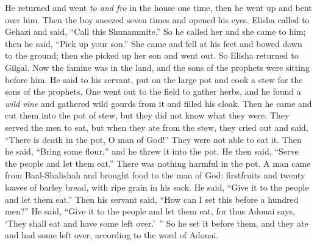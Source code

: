 \begin{biblechapter}
\verse He returned and went \textit{to and fro} in the house one time, then he went up and bent over him. Then the boy sneezed seven times and opened his eyes.
\verse Elisha called to Gehazi and said, “Call this Shunammite.” So he called her and she came to him; then he said, “Pick up your son.”
\verse She came and fell at his feet and bowed down to the ground; then she picked up her son and went out.
 So Elisha returned to Gilgal. Now the famine was in the land, and the sons of the prophets were sitting before him. He said to his servant, put on the large pot and cook a stew for the sons of the prophets.
\verse One went out to the field to gather herbs, and he found a \textit{wild vine} and gathered wild gourds from it and filled his cloak. Then he came and cut them into the pot of stew, but they did not know what they were.
\verse They served the men to eat, but when they ate from the stew, they cried out and said, “There is death in the pot, O man of God!” They were not able to eat it.
\verse Then he said, “Bring some flour,” and he threw it into the pot. He then said, “Serve the people and let them eat.” There was nothing harmful in the pot.
\verse A man came from Baal-Shalishah and brought food to the man of God: firstfruits and twenty loaves of barley bread, with ripe grain in his sack. He said, “Give it to the people and let them eat.”
\verse Then his servant said, “How can I set this before a hundred men?” He said, “Give it to the people and let them eat, for thus Adonai says, ‘They shall eat and have some left over.’ ”
\verse So he set it before them, and they ate and had some left over, according to the word of Adonai.
\end{biblechapter}

